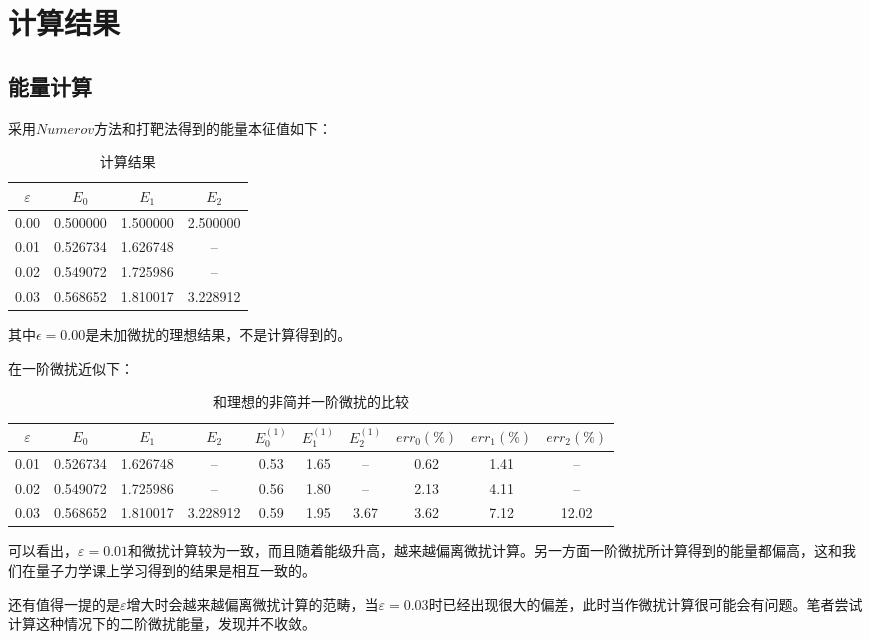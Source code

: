 \documentclass[UTF8]{ctexart}
\begin{document}
	\section{计算结果}
	
	\subsection{能量计算}
		
	\begin{flushleft}
		采用$Numerov$方法和打靶法得到的能量本征值如下：
	\end{flushleft}
	
		
		\begin{table}[H]
				\centering
				\begin{tabular}{@{}cccc@{}}
					\toprule
					$\varepsilon$& $E_{0}$ &$E_{1}$  &$E_{2}$ \\ \midrule
					0.00&  0.500000&  1.500000&  2.500000  \\
					0.01&  0.526734&  1.626748&  --  \\
					0.02&  0.549072&  1.725986&  --  \\
					0.03&  0.568652&  1.810017&  3.228912  \\ \bottomrule
				\end{tabular}
			\caption{计算结果}
	\end{table}

	\begin{flushleft}
		其中$\epsilon=0.00$是未加微扰的理想结果，不是计算得到的。
	\end{flushleft}
		
		

	\begin{flushleft}
		
		在一阶微扰近似下：
		
			\begin{table}[H]
			\centering
			\begin{tabular}{@{}cccccccccc@{}}
				\toprule
				$\varepsilon$& $E_{0}$ &$E_{1}$  &$E_{2}$ & $E_{0}^{(1)}$ &$E_{1}^{(1)}$  &$E_{2}^{(1)}$&$err_0(\%)$&$err_1(\%)$&$err_2(\%)$  \\ \midrule
				0.01&  0.526734&  1.626748&  -- &0.53&1.65&--&0.62&1.41&-- \\
				0.02&  0.549072&  1.725986&  --  &0.56&1.80&--&2.13&4.11&--\\
				0.03&  0.568652&  1.810017&  3.228912&0.59&1.95&3.67&3.62&7.12&12.02  \\ \bottomrule
			\end{tabular}
			\caption{和理想的非简并一阶微扰的比较}
		\end{table}
	
	可以看出，$\varepsilon=0.01$和微扰计算较为一致，而且随着能级升高，越来越偏离微扰计算。另一方面一阶微扰所计算得到的能量都偏高，这和我们在量子力学课上学习得到的结果是相互一致的。
	
	还有值得一提的是$\varepsilon$增大时会越来越偏离微扰计算的范畴，当$\varepsilon=0.03$时已经出现很大的偏差，此时当作微扰计算很可能会有问题。笔者尝试计算这种情况下的二阶微扰能量，发现并不收敛。
	
	\end{flushleft}
\end{document}
